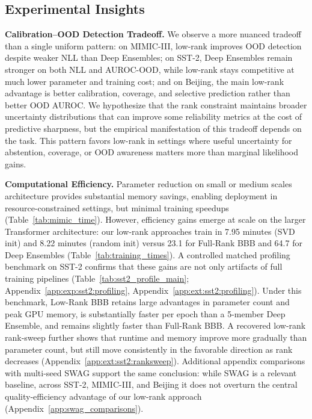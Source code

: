 \documentclass{article}
\theoremstyle{plain}
\theoremstyle{definition}
\theoremstyle{remark}
\begin{document}
\subsection{Experimental Insights}
\label{exp:insight}
\textbf{Calibration–OOD Detection Tradeoff.}
We observe a more nuanced tradeoff than a single uniform pattern: on MIMIC-III, low-rank improves OOD detection despite weaker NLL than Deep Ensembles; on SST-2, Deep Ensembles remain stronger on both NLL and AUROC-OOD, while low-rank stays competitive at much lower parameter and training cost; and on Beijing, the main low-rank advantage is better calibration, coverage, and selective prediction rather than better OOD AUROC. We hypothesize that the rank constraint maintains broader uncertainty distributions that can improve some reliability metrics at the cost of predictive sharpness, but the empirical manifestation of this tradeoff depends on the task. This pattern favors low-rank in settings where useful uncertainty for abstention, coverage, or OOD awareness matters more than marginal likelihood gains.


\textbf{Computational Efficiency.}
Parameter reduction on small or medium scales architecture provides substantial memory savings, enabling deployment in resource-constrained settings, but minimal training speedups (Table~\ref{tab:mimic_time}). However, efficiency gains emerge at scale on the larger Transformer architecture: our low-rank approaches train in 7.95 minutes (SVD init) and 8.22 minutes (random init) versus 23.1 for Full-Rank BBB and 64.7 for Deep Ensembles (Table~\ref{tab:training_times}). A controlled matched profiling benchmark on SST-2 confirms that these gains are not only artifacts of full training pipelines (Table~\ref{tab:sst2_profile_main}; Appendix~\ref{app:exp:sst2:profiling}, Appendix~\ref{app:ext:sst2:profiling}). Under this benchmark, Low-Rank BBB retains large advantages in parameter count and peak GPU memory, is substantially faster per epoch than a 5-member Deep Ensemble, and remains slightly faster than Full-Rank BBB. A recovered low-rank rank-sweep further shows that runtime and memory improve more gradually than parameter count, but still move consistently in the favorable direction as rank decreases (Appendix~\ref{app:ext:sst2:ranksweep}). Additional appendix comparisons with multi-seed SWAG \cite{maddox2019swag} support the same conclusion: while SWAG is a relevant baseline, across SST-2, MIMIC-III, and Beijing it does not overturn the central quality-efficiency advantage of our low-rank approach (Appendix~\ref{app:swag_comparisons}).
\end{document}
